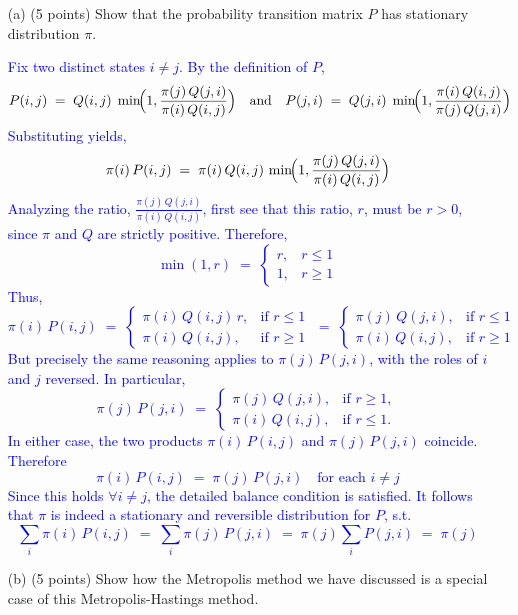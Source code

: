 \documentclass{article}
\begin{document}
\begin{itemize}

    \item[(a)] (5 points) Show that the probability transition matrix $P$ has stationary distribution $\pi$. 

    \textcolor{blue}{Fix two distinct states $i \neq j$. By the definition of $P$,
\[
  P(i,j)
  \;=\;
  Q(i,j)\;\min\!\Bigl(1,\frac{\pi(j)\,Q(j,i)}{\pi(i)\,Q(i,j)}\Bigr) \quad \text{and}
  \quad
  P(j,i)
  \;=\;
  Q(j,i)\;\min\!\Bigl(1,\frac{\pi(i)\,Q(i,j)}{\pi(j)\,Q(j,i)}\Bigr)
\]
Substituting yields,
\[
  \pi(i)\,P(i,j)
  \;=\;
  \pi(i)\,Q(i,j)\,\min\!\Bigl(1,\frac{\pi(j)\,Q(j,i)}{\pi(i)\,Q(i,j)}\Bigr)
\]
Analyzing the ratio, $\frac{\pi(j)\,Q(j,i)}{\pi(i)\,Q(i,j)}$, first see that this ratio, $r$, must be $r > 0$, since $\pi$ and $Q$ are strictly positive. Therefore,
\[
  \min(1,r) \;=\;
  \begin{cases}
  r, & r \le 1\\
  1, & r \ge 1
  \end{cases}
\]
Thus,
\[
  \pi(i)\,P(i,j)
  \;=\;
  \begin{cases}
  \pi(i)\,Q(i,j)\,r, & \text{if } r \le 1\\[3pt]
  \pi(i)\,Q(i,j), & \text{if } r \ge 1
  \end{cases}
  \;=\;
  \begin{cases}
  \pi(j)\,Q(j,i), & \text{if } r \le 1\\[3pt]
  \pi(i)\,Q(i,j), & \text{if } r \ge 1
  \end{cases}
\]
But precisely the same reasoning applies to $\pi(j)\,P(j,i)$, with the roles of $i$ and $j$ reversed. In particular,
\[
  \pi(j)\,P(j,i)
  \;=\;
  \begin{cases}
  \pi(j)\,Q(j,i), & \text{if } r \ge 1,\\[3pt]
  \pi(i)\,Q(i,j), & \text{if } r \le 1.
  \end{cases}
\]
In either case, the two products $\pi(i)\,P(i,j)$ and $\pi(j)\,P(j,i)$ coincide. Therefore
\[
  \pi(i)\,P(i,j) \;=\; \pi(j)\,P(j,i)
  \quad\text{for each }i\neq j
\]
Since this holds $\forall i \neq j$, the detailed balance condition is satisfied. 
It follows that $\pi$ is indeed a stationary and reversible distribution for $P$, s.t.
\[
  \sum_{i}\pi(i)\,P(i,j) 
  \;=\; \sum_{i}\pi(j)\,P(j,i)
  \;=\;
  \pi(j)\sum_{i}P(j,i)
  \;=\;
  \pi(j)
\]}

    \item[(b)] (5 points) Show how the Metropolis method we have discussed is a special case of this Metropolis-Hastings method.


\end{itemize}
\end{document}
